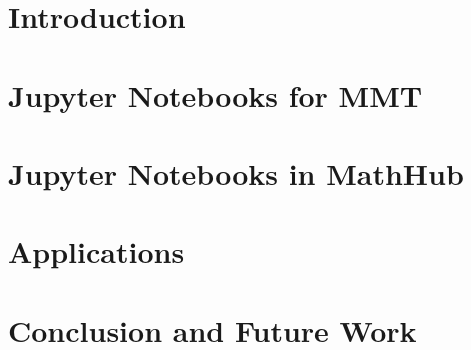 \documentclass{deliverablereport}
\author{Kai Amann, Michael Kohlhase, Florian Rabe, Tom Wiesing}
\begin{document}
\maketitle
\begin{abstract}\strut\\\end{abstract}

\setcounter{tocdepth}{2}
\newpage
\tableofcontents
\clearpage

\section{Introduction}\label{sec:intro}
\newpage

\section{Jupyter Notebooks for MMT}\label{sec:mmt-jp}
\newpage

\section{Jupyter Notebooks in MathHub}\label{sec:nb-mh}
\newpage

\section{Applications}\label{sec:mitm-nb}
\newpage

\section{Conclusion and Future Work}\label{sec:concl}
\newpage

\printbibliography
\end{document}
